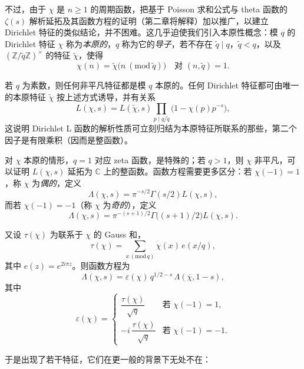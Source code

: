 不过，由于 $\chi$ 是 $n\ge 1$ 的周期函数，把基于 Poisson 求和公式与 theta 函数的 $\zeta(s)$ 解析延拓及其函数方程的证明（第二章将解释）加以推广，以建立 Dirichlet 特征的类似结论，并不困难。这几乎迫使我们引入本原性概念：模 $q$ 的 Dirichlet 特征 $\chi$ 称为\emph{本原的}，$q$ 称为它的\emph{导子}，若不存在 $\tilde q\mid q$，$\tilde q<q$，以及 $(\mathbb{Z}/\tilde q\mathbb{Z})^{\times}$ 的特征 $\tilde\chi$，使得
\[
\chi(n)=\tilde\chi\bigl(n\ (\mathrm{mod}\ \tilde q)\bigr)\quad\text{对 }(n,\tilde q)=1.
\]

若 $q$ 为素数，则任何非平凡特征都是模 $q$ 本原的。任何 Dirichlet 特征都可由唯一的本原特征 $\tilde\chi$ 按上述方式诱导，并有关系
\begin{equation}\tag{3.1}\label{eq:3.1}
L(\chi,s)=L(\tilde\chi,s)\prod_{p\mid q/\tilde q}\bigl(1-\chi(p)p^{-s}\bigr),
\end{equation}
这说明 Dirichlet L 函数的解析性质可立刻归结为本原特征所联系的那些，第二个因子是有限乘积（因而是整函数）。

对 $\chi$ 本原的情形，$q=1$ 对应 zeta 函数，是特殊的；若 $q>1$，则 $\chi$ 非平凡，可以证明 $L(\chi,s)$ 延拓为 $\mathbb{C}$ 上的整函数。函数方程需要更多区分：若 $\chi(-1)=1$，称 $\chi$ 为\emph{偶的}，定义
\[
\Lambda(\chi,s)=\pi^{-s/2}\Gamma(s/2)L(\chi,s),
\]
而若 $\chi(-1)=-1$（称 $\chi$ 为\emph{奇的}），定义
\[
\Lambda(\chi,s)=\pi^{-(s+1)/2}\Gamma\bigl((s+1)/2\bigr)L(\chi,s).
\]

又设 $\tau(\chi)$ 为联系于 $\chi$ 的 Gauss 和，
\begin{equation}\tag{3.2}\label{eq:3.2}
\tau(\chi)=\sum_{x\,(\mathrm{mod}\,q)}\chi(x)\,e(x/q),
\end{equation}
其中 $e(z)=e^{2i\pi z}$。则函数方程为
\begin{equation}\tag{3.3}\label{eq:3.3}
\Lambda(\chi,s)=\varepsilon(\chi)\,q^{1/2-s}\,\Lambda(\overline{\chi},1-s),
\end{equation}
其中
\begin{equation}\tag{3.4}\label{eq:3.4}
\varepsilon(\chi)=
\begin{cases}
\dfrac{\tau(\chi)}{\sqrt{q}} & \text{若 } \chi(-1)=1,\\[2.6mm]
-i\,\dfrac{\tau(\chi)}{\sqrt{q}} & \text{若 } \chi(-1)=-1.
\end{cases}
\end{equation}

于是出现了若干特征，它们在更一般的背景下无处不在：

